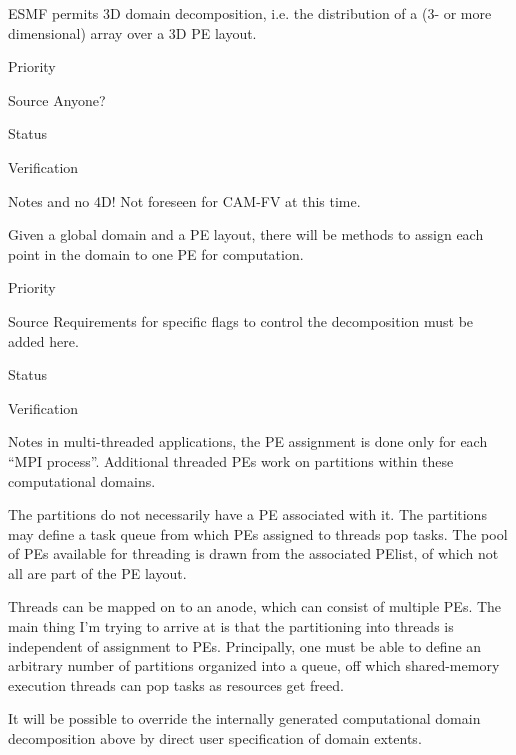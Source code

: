 
ESMF permits 3D domain decomposition, i.e. the distribution of a
(3- or more dimensional) array over a 3D PE layout.

\begin{reqlist}
\item[Priority]
\item[Source] Anyone?
\item[Status]
\item[Verification]
\item[Notes] and no 4D!    Not foreseen for CAM-FV at this time.
\end{reqlist}


Given a global domain and a PE layout, there will be methods to assign
each point in the domain to one PE for computation. 

\begin{reqlist}
\item[Priority] 
\item[Source] Requirements for specific flags to control the
  decomposition must be added here.
\item[Status]
\item[Verification]
\item[Notes] in multi-threaded applications, the PE assignment is done
  only for each ``MPI process''. Additional threaded PEs work on
  partitions within these computational domains.
  
  The partitions do not necessarily have a PE associated with it. The
  partitions may define a task queue from which PEs assigned to
  threads pop tasks. The pool of PEs available for threading is drawn
  from the associated PElist, of which not all are part of the PE
  layout.
  
  Threads can be mapped on to an anode, which can consist of multiple
  PEs.  The main thing I'm trying to arrive at is that the
  partitioning into threads is independent of assignment to PEs.
  Principally, one must be able to define an arbitrary number of
  partitions organized into a queue, off which shared-memory execution
  threads can pop tasks as resources get freed.
\end{reqlist}


It will be possible to override the internally generated computational
domain decomposition above by direct user specification of domain
extents.

